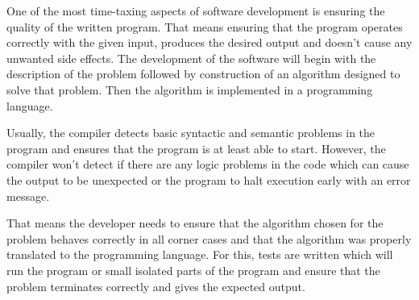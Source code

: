 \documentclass[..thesis.tex]{subfiles}
\begin{document}
One of the most time-taxing aspects of software development is ensuring the quality of the written program. 
That means ensuring that the program operates correctly with the given input, produces the desired output and doesn't cause any unwanted side effects.
The development of the software will begin with the description of the problem followed by construction of an algorithm designed to solve that problem. 
Then the algorithm is implemented in a programming language.

Usually, the compiler detects basic syntactic and semantic problems in the program and ensures that the program is at least able to start. 
However, the compiler won't detect if there are any logic problems in the code which can cause the output to be unexpected or the program to halt execution early with an error message.

That means the developer needs to ensure that the algorithm chosen for the problem behaves correctly in all corner cases and that the algorithm was properly translated to the programming language. 
For this, tests are written which will run the program or small isolated parts of the program and ensure that the problem terminates correctly and gives the expected output.
\end{document}
